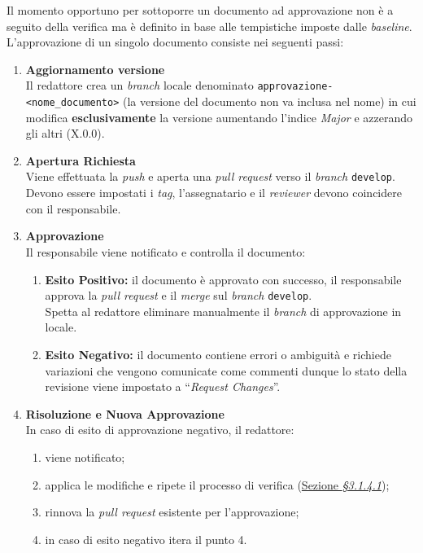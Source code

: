 \documentclass[10pt, letterpaper]{article}
\begin{document}
Il momento opportuno per sottoporre un documento ad approvazione non è a seguito della verifica ma è definito in base alle tempistiche imposte dalle \textit{baseline}.\\
L'approvazione di un singolo documento consiste nei seguenti passi:
\begin{enumerate}
    \item \textbf{Aggiornamento versione}\\
          Il redattore crea un \textit{branch} locale denominato \texttt{approvazione-<nome\_documento>} (la versione del documento non va inclusa nel nome)
          in cui modifica \textbf{esclusivamente} la versione aumentando l'indice \textit{Major} e azzerando gli altri (X.0.0).
    \item \textbf{Apertura Richiesta}\\
          Viene effettuata la \textit{push} e aperta una \textit{pull request} verso il \textit{branch} \texttt{develop}. Devono essere impostati i \textit{tag}, l'assegnatario e il \textit{reviewer} devono coincidere con il responsabile.
    \item \textbf{Approvazione}\\
          Il responsabile viene notificato e controlla il documento:
          \begin{enumerate}
              \item \textbf{Esito Positivo:} il documento è approvato con successo, il responsabile approva la \textit{pull request} e il
                    \textit{merge} sul \textit{branch} \texttt{develop}.\\
                    Spetta al redattore eliminare manualmente il \textit{branch} di approvazione in locale.
              \item \textbf{Esito Negativo:} il documento contiene errori o ambiguità e richiede variazioni che vengono comunicate come commenti dunque lo stato della revisione viene impostato a ``\textit{Request Changes}''.
          \end{enumerate}
    \item \textbf{Risoluzione e Nuova Approvazione}\\
          In caso di esito di approvazione negativo, il redattore:
          \begin{enumerate}
              \item viene notificato;
              \item applica le modifiche e ripete il processo di verifica (\hyperref[sec:Verifica]{Sezione \textit{§3.1.4.1}});
              \item rinnova la \textit{pull request} esistente per l'approvazione;
              \item in caso di esito negativo itera il punto 4.
          \end{enumerate}

\end{enumerate}
\end{document}
